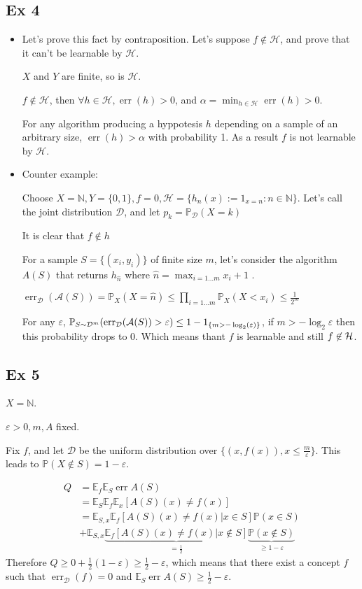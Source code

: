 \documentclass[12pt]{article}
\newcommand{\Q}[1]{\subsection*{Ex #1}}
\newenvironment{question}[1]
{\Q{#1}}{}
\newcommand{\esp}{{\mathbb E}}
\newcommand{\pr}{{\mathbb P}}
\DeclareMathOperator{\err}{err}
\begin{document}
\begin{question}{4}
\begin{itemize}
\item
  Let's prove this fact by contraposition. Let's suppose $f \not \in \mathcal H$, and prove that it can't be learnable by $\mathcal H$.
  
  $X$ and $Y$ are finite, so is $\mathcal H$.
  
  $f \not \in \mathcal H$, then $\forall h \in \mathcal H, \err(h) > 0$, and $\alpha = \min_{h \in \mathcal H} \err(h) > 0$.

  For any algorithm producing a hyppotesis $h$ depending on a sample of an arbitrary size, $\err(h) > \alpha$ with probability 1.
  As a result $f$ is not learnable by $\mathcal H$.
  
\item
  Counter example:
  
  Choose $X = \mathbb N, Y = \{0, 1\}, f = 0, \mathcal H = \{ h_n(x) := 1_{x = n} : n \in \mathbb N \}$.
  Let's call the joint distribution $\mathcal D$, and let $p_k = \pr_{\mathcal D}(X = k)$
  
  It is clear that $f \not \in h$

  For a sample $S = \{ (x_i, y_i) \}$ of finite size $m$, let's consider the algorithm $A(S)$ that returns $h_{\hat n}$ where $\hat n = \max_{i=1\ldots m} x_i + 1$ .
  
  $\err_{\mathcal D}(\mathcal A(S)) = \pr_{X}(X = \hat n) \le \prod_{i=1\ldots m} \pr_{X}(X < x_i) \le \frac1{2^m}$

  For any $\varepsilon$, $\pr_{S \sim {\cal D}^m}( \err_{\mathcal D}(\mathcal A(S)) > \varepsilon ) \le 1 - 1_{\{ m > -\log_2(\varepsilon)\}}$, if $m > -\log_2 \varepsilon$ then this probability drops to 0.
  Which means thant $f$ is learnable and still $f \not \in {\cal H}$.
\end{itemize}
\end{question}
\begin{question}{5}

$X = \mathbb N$.

$\varepsilon > 0, m, A$ fixed.

Fix $f$, and let $\mathcal D$ be the uniform distribution over $\{(x, f(x)), x \le \frac m \varepsilon\}$. This leads to $\pr(X \not \in S) = 1 - \varepsilon$.

\begin{align*}
  Q &= \esp_f  \esp_S \err A(S)
  \\&= \esp_S \esp_f  \esp_x  [A(S)(x) \ne f(x)]
  \\&= \esp_{S,x} \esp_f    [A(S)(x) \ne f(x) | x \in S] \mathbb{P}(x \in S)
  \\&+ \esp_{S,x} \underbrace{\esp_f  [A(S)(x) \ne f(x) | x \not \in S]}_{= \frac12} \underbrace{\mathbb{P}(x \not \in S)}_{\ge 1 - \varepsilon}
\end{align*}
Therefore $Q \ge 0 + \frac12 (1 - \varepsilon) \ge \frac12 - \varepsilon$, which means that there exist a concept $f$ such that
$\err_{\mathcal D}(f) = 0$ and $\esp_S \err A(S) \ge \frac12 - \varepsilon$.

\end{question}
\end{document}

